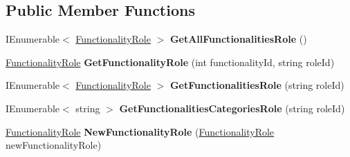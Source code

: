 \subsection*{Public Member Functions}
\begin{DoxyCompactItemize}
\item 
\mbox{\label{class_h_k_supply_1_1_services_1_1_implementations_1_1_e_f_functionality_role_a6c0fd4aad39788ef597f701f47032a85}} 
I\+Enumerable$<$ \hyperlink{class_h_k_supply_1_1_models_1_1_functionality_role}{Functionality\+Role} $>$ {\bfseries Get\+All\+Functionalities\+Role} ()
\item 
\mbox{\label{class_h_k_supply_1_1_services_1_1_implementations_1_1_e_f_functionality_role_a1900a194c92ba75d17fe42830190895f}} 
\hyperlink{class_h_k_supply_1_1_models_1_1_functionality_role}{Functionality\+Role} {\bfseries Get\+Functionality\+Role} (int functionality\+Id, string role\+Id)
\item 
\mbox{\label{class_h_k_supply_1_1_services_1_1_implementations_1_1_e_f_functionality_role_a0cec1ef9a2e1201cfffe604869e5192f}} 
I\+Enumerable$<$ \hyperlink{class_h_k_supply_1_1_models_1_1_functionality_role}{Functionality\+Role} $>$ {\bfseries Get\+Functionalities\+Role} (string role\+Id)
\item 
\mbox{\label{class_h_k_supply_1_1_services_1_1_implementations_1_1_e_f_functionality_role_a1625ffb6313337132a446f831d357453}} 
I\+Enumerable$<$ string $>$ {\bfseries Get\+Functionalities\+Categories\+Role} (string role\+Id)
\item 
\mbox{\label{class_h_k_supply_1_1_services_1_1_implementations_1_1_e_f_functionality_role_a07805a2c9809f3771b7ae34deb15b94b}} 
\hyperlink{class_h_k_supply_1_1_models_1_1_functionality_role}{Functionality\+Role} {\bfseries New\+Functionality\+Role} (\hyperlink{class_h_k_supply_1_1_models_1_1_functionality_role}{Functionality\+Role} new\+Functionality\+Role)
\item 

\end{DoxyCompactItemize}
